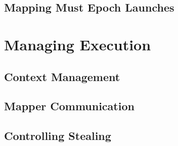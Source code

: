 \subsection{Mapping Must Epoch Launches}
\label{subsec:mapping:mustepoch}



\section{Managing Execution}
\label{sec:mapping:execution}

\subsection{Context Management}
\label{subsec:mapping:context}

\subsection{Mapper Communication}
\label{subsec:mapping:communication}

\subsection{Controlling Stealing}
\label{subsec:mapping:stealing}

